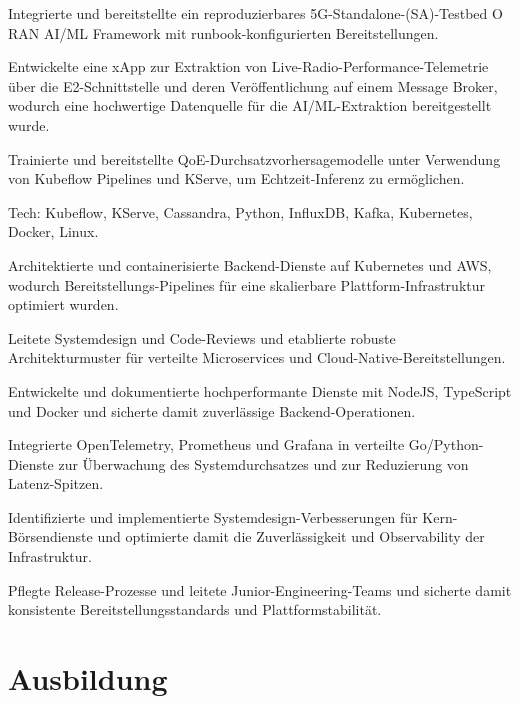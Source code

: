 \documentclass[10pt,a4paper]{resume}
\begin{document}
\bullets
  \item Integrierte und bereitstellte ein reproduzierbares 5G-Standalone-(SA)-Testbed O RAN AI/ML Framework mit runbook-konfigurierten Bereitstellungen.
  \item Entwickelte eine xApp zur Extraktion von Live-Radio-Performance-Telemetrie über die E2-Schnittstelle und deren Veröffentlichung auf einem Message Broker, wodurch eine hochwertige Datenquelle für die AI/ML-Extraktion bereitgestellt wurde.
  \item Trainierte und bereitstellte QoE-Durchsatzvorhersagemodelle unter Verwendung von Kubeflow Pipelines und KServe, um Echtzeit-Inferenz zu ermöglichen.
  \item Tech: Kubeflow, KServe, Cassandra, Python, InfluxDB, Kafka, Kubernetes, Docker, Linux.
\bulletsend
\vspace{1.5pt}
\bullets
  \item Architektierte und containerisierte Backend-Dienste auf Kubernetes und AWS, wodurch Bereitstellungs-Pipelines für eine skalierbare Plattform-Infrastruktur optimiert wurden.
  \item Leitete Systemdesign und Code-Reviews und etablierte robuste Architekturmuster für verteilte Microservices und Cloud-Native-Bereitstellungen.
  \item Entwickelte und dokumentierte hochperformante Dienste mit NodeJS, TypeScript und Docker und sicherte damit zuverlässige Backend-Operationen.
\bulletsend
\vspace{1.5pt}
\bullets
  \item Integrierte OpenTelemetry, Prometheus und Grafana in verteilte Go/Python-Dienste zur Überwachung des Systemdurchsatzes und zur Reduzierung von Latenz-Spitzen.
  \item Identifizierte und implementierte Systemdesign-Verbesserungen für Kern-Börsendienste und optimierte damit die Zuverlässigkeit und Observability der Infrastruktur.
  \item Pflegte Release-Prozesse und leitete Junior-Engineering-Teams und sicherte damit konsistente Bereitstellungsstandards und Plattformstabilität.
\bulletsend
\vspace{1.5pt}

\section{Ausbildung}
\end{document}
